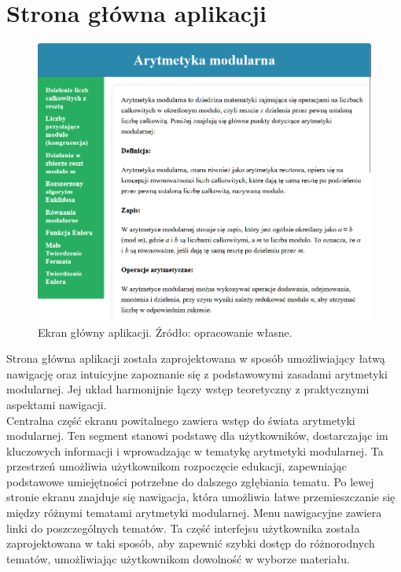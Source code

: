 \documentclass{SGGW-thesis}
\begin{document}
	\section{Strona główna aplikacji}
	\begin{figure}[h]
		\centering
		\includegraphics[width=1\textwidth]{ekranglowny.png}
		\caption{Ekran główny aplikacji. Źródło: opracowanie własne.}
		\label{fig:glowny}
	\end{figure}
	\vspace{1em}
	\noindent Strona główna aplikacji została zaprojektowana w sposób umożliwiający łatwą nawigację oraz intuicyjne zapoznanie się z podstawowymi zasadami arytmetyki modularnej. Jej układ harmonijnie łączy wstęp teoretyczny z praktycznymi aspektami nawigacji.
	\\
	Centralna część ekranu powitalnego zawiera wstęp do świata arytmetyki modularnej. Ten segment stanowi podstawę dla użytkowników, dostarczając im kluczowych informacji i wprowadzając w tematykę arytmetyki modularnej. Ta przestrzeń umożliwia użytkownikom rozpoczęcie edukacji, zapewniając podstawowe umiejętności potrzebne do dalszego zgłębiania tematu.
	Po lewej stronie ekranu znajduje się nawigacja, która umożliwia łatwe przemieszczanie się między różnymi tematami arytmetyki modularnej. Menu nawigacyjne zawiera linki do poszczególnych tematów. Ta część interfejsu użytkownika została zaprojektowana w taki sposób, aby zapewnić szybki dostęp do różnorodnych tematów, umożliwiając użytkownikom dowolność w wyborze materiału.
	\newpage
	
\end{document}
